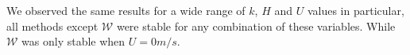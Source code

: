 
We observed the same results for a wide range of $k$, $H$ and $U$ values in particular, all methods except $\mathcal{W}$ were stable for any combination of these variables. While $\mathcal{W}$ was only stable when $U = 0m/s$.


